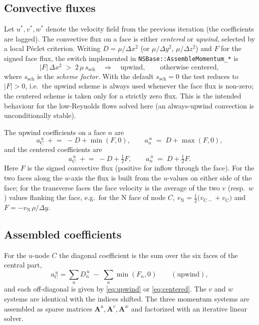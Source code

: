 \documentclass[11pt,a4paper]{article}
\newcommand{\cn}{\mathrm{N}}
\newcommand{\cc}{\mathrm{C}}
\begin{document}
\subsection{Convective fluxes}
\label{sec:convective}

Let $u^{*},v^{*},w^{*}$ denote the velocity field from the previous iteration
(the coefficients are lagged).  The convective flux on a face is either
\emph{centered} or \emph{upwind}, selected by a local P\'eclet criterion.
Writing $D=\mu/\Delta x^{2}$ (or $\mu/\Delta y^{2}$, $\mu/\Delta z^{2}$) and
$F$ for the signed face flux, the switch implemented in
\texttt{NSBase::AssembleMomentum\_*} is
\begin{equation}
|F|\,\Delta x^{2} \;>\; 2\,\mu\,s_{\mathrm{sch}}
\quad\Longrightarrow\quad \text{upwind},
\qquad\text{otherwise centered},
\end{equation}
where $s_{\mathrm{sch}}$ is the \emph{scheme factor}.  With the default
$s_{\mathrm{sch}}=0$ the test reduces to $|F|>0$, i.e.\ the upwind scheme is
always used whenever the face flux is non-zero; the centered scheme is taken
only for a strictly zero flux.  This is the intended behaviour for the
low-Reynolds flows solved here (an always-upwind convection is
unconditionally stable).

The upwind coefficients on a face $n$ are
\begin{equation}
a^{\,u}_{\cc}\;\mathrel{+}=\;-D+\min(F,0),
\qquad
a^{\,u}_{n}\;=\;D+\max(F,0),
\label{eq:upwind}
\end{equation}
and the centered coefficients are
\begin{equation}
a^{\,u}_{\cc}\;\mathrel{+}=\;-D+\tfrac{1}{2}F,
\qquad
a^{\,u}_{n}\;=\;D+\tfrac{1}{2}F .
\label{eq:centered}
\end{equation}
Here $F$ is the signed convective flux (positive for inflow through the face).
For the two faces along the $u$-axis the flux is built from the $u$-values on
either side of the face; for the transverse faces the face velocity is the
average of the two $v$ (resp.\ $w$) values flanking the face, e.g.\ for the
$\cn$ face of node $C$, $v_{\cn}=\tfrac12\bigl(v_{\cc-}+v_{\cc}\bigr)$ and
$F=-v_{\cn}\,\rho/\Delta y$.

\subsection{Assembled coefficients}
\label{sec:coeffs}

For the $u$-node $C$ the diagonal coefficient is the sum over the six faces
of the central part,
\begin{equation}
a^{\,u}_{\cc}=\sum_{n} D^{\,u}_{n}\;-\;\sum_{n}\min(F_{n},0)
\qquad(\text{upwind}) ,
\end{equation}
and each off-diagonal is given by \eqref{eq:upwind} or \eqref{eq:centered}.
The $v$ and $w$ systems are identical with the indices shifted.  The three
momentum systems are assembled as sparse matrices $\mathbf{A}^{u},
\mathbf{A}^{v},\mathbf{A}^{w}$ and factorized with an iterative linear
solver.
\end{document}
